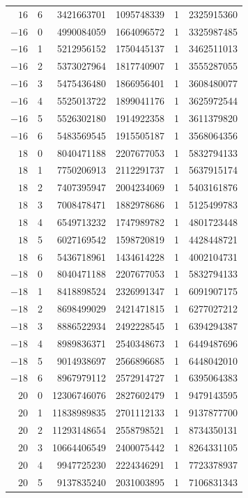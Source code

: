 {\begin{longtable}{rrrrrr}
$16$ & 6 & 3421663701 & 1095748339 & 1 & 2325915360\\
$-16$ & 0 & 4990084059 & 1664096572 & 1 & 3325987485\\
$-16$ & 1 & 5212956152 & 1750445137 & 1 & 3462511013\\
$-16$ & 2 & 5373027964 & 1817740907 & 1 & 3555287055\\
$-16$ & 3 & 5475436480 & 1866956401 & 1 & 3608480077\\
$-16$ & 4 & 5525013722 & 1899041176 & 1 & 3625972544\\
$-16$ & 5 & 5526302180 & 1914922358 & 1 & 3611379820\\
$-16$ & 6 & 5483569545 & 1915505187 & 1 & 3568064356\\
$18$ & 0 & 8040471188 & 2207677053 & 1 & 5832794133\\
$18$ & 1 & 7750206913 & 2112291737 & 1 & 5637915174\\
$18$ & 2 & 7407395947 & 2004234069 & 1 & 5403161876\\
$18$ & 3 & 7008478471 & 1882978686 & 1 & 5125499783\\
$18$ & 4 & 6549713232 & 1747989782 & 1 & 4801723448\\
$18$ & 5 & 6027169542 & 1598720819 & 1 & 4428448721\\
$18$ & 6 & 5436718961 & 1434614228 & 1 & 4002104731\\
$-18$ & 0 & 8040471188 & 2207677053 & 1 & 5832794133\\
$-18$ & 1 & 8418898524 & 2326991347 & 1 & 6091907175\\
$-18$ & 2 & 8698499029 & 2421471815 & 1 & 6277027212\\
$-18$ & 3 & 8886522934 & 2492228545 & 1 & 6394294387\\
$-18$ & 4 & 8989836371 & 2540348673 & 1 & 6449487696\\
$-18$ & 5 & 9014938697 & 2566896685 & 1 & 6448042010\\
$-18$ & 6 & 8967979112 & 2572914727 & 1 & 6395064383\\
$20$ & 0 & 12306746076 & 2827602479 & 1 & 9479143595\\
$20$ & 1 & 11838989835 & 2701112133 & 1 & 9137877700\\
$20$ & 2 & 11293148654 & 2558798521 & 1 & 8734350131\\
$20$ & 3 & 10664406549 & 2400075442 & 1 & 8264331105\\
$20$ & 4 & 9947725230 & 2224346291 & 1 & 7723378937\\
$20$ & 5 & 9137835240 & 2031003895 & 1 & 7106831343\\

\end{longtable}}
